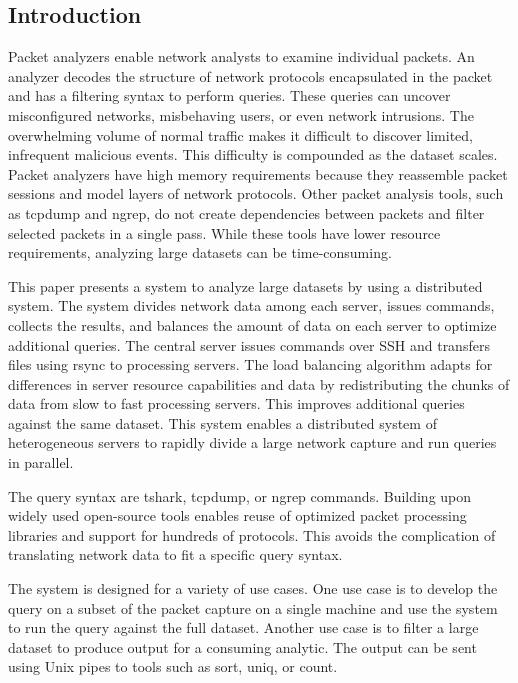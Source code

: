 \documentclass{article}
\begin{document}
\begin{multicols}{2}
  
\section*{Introduction} %


Packet analyzers enable network analysts to examine individual packets.  An analyzer decodes the structure of network protocols encapsulated in the packet and has a filtering syntax to perform queries.  These queries can uncover misconfigured networks, misbehaving users, or even network intrusions. The overwhelming volume of normal traffic makes it difficult to discover limited, infrequent malicious events. This difficulty is compounded as the dataset scales. Packet analyzers have high memory requirements \cite{wireshark} because they reassemble packet sessions and model layers of network protocols.  Other packet analysis tools, such as tcpdump and ngrep, do not create dependencies between packets and filter selected packets in a single pass. While these tools have lower resource requirements, analyzing large datasets can be time-consuming. 

This paper presents a system to analyze large datasets by using a distributed system. The system divides network data among each server, issues commands, collects the results, and balances the amount of data on each server to optimize additional queries. The central server issues commands over SSH and transfers files using rsync to processing servers. The load balancing algorithm adapts for differences in server resource capabilities and data by redistributing the chunks of data from slow to fast processing servers. This improves additional queries against the same dataset. This system enables a distributed system of heterogeneous servers to rapidly divide a large network capture and run queries in parallel. 

The query syntax are tshark, tcpdump, or ngrep commands. Building upon widely used open-source tools enables reuse of optimized packet processing libraries and support for hundreds of protocols. This avoids the complication of translating network data to fit a specific query syntax.  

The system is designed for a variety of use cases. One use case is to develop the query on a subset of the packet capture on a single machine and use the system to run the query against the full dataset.  Another use case is to filter a large dataset to produce output for a consuming analytic. The output can be sent using Unix pipes to tools such as sort, uniq, or count. 


\end{multicols}
\end{document}
